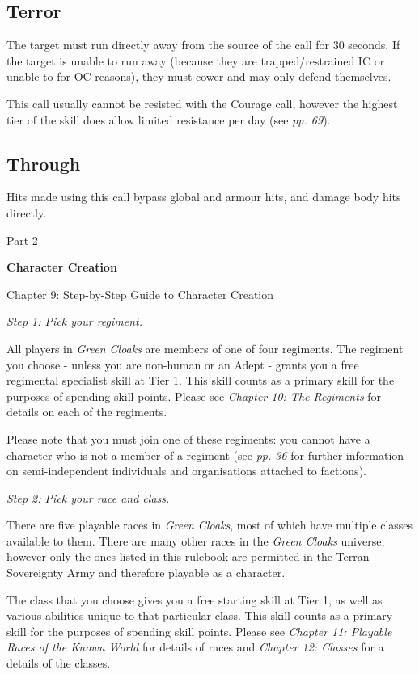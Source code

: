 \documentclass{scrbook}
\begin{document}
\subsection{Terror}

The target must run directly away from the source of the call for 30 seconds. If the target is unable to run away (because they are trapped/restrained IC or unable to for OC reasons), they must cower and may only defend themselves.

This call usually cannot be resisted with the Courage call, however the highest tier of the skill does allow limited resistance per day (see \textit{pp. 69}).

\subsection{Through}

Hits made using this call bypass global and armour hits, and damage body hits directly.

Part 2 -

\textbf{Character Creation}

Chapter 9: Step-by-Step Guide to Character Creation

\textit{Step 1: Pick your regiment.}

All players in \textit{Green Cloaks} are members of one of four regiments. The regiment you choose - unless you are non-human or an Adept - grants you a free regimental specialist skill at Tier 1. This skill counts as a primary skill for the purposes of spending skill points. Please see \textit{Chapter 10: The Regiments} for details on each of the regiments.

Please note that you must join one of these regiments: you cannot have a character who is not a member of a regiment (see \textit{pp. 36} for further information on semi-independent individuals and organisations attached to factions).

\textit{Step 2: Pick your race and class.}

There are five playable races in \textit{Green Cloaks}, most of which have multiple classes available to them. There are many other races in the \textit{Green Cloaks} universe, however only the ones listed in this rulebook are permitted in the Terran Sovereignty Army and therefore playable as a character.

The class that you choose gives you a free starting skill at Tier 1, as well as various abilities unique to that particular class. This skill counts as a primary skill for the purposes of spending skill points. Please see \textit{Chapter 11: Playable Races of the Known World} for details of races and \textit{Chapter 12: Classes} for a details of the classes.
\end{document}
